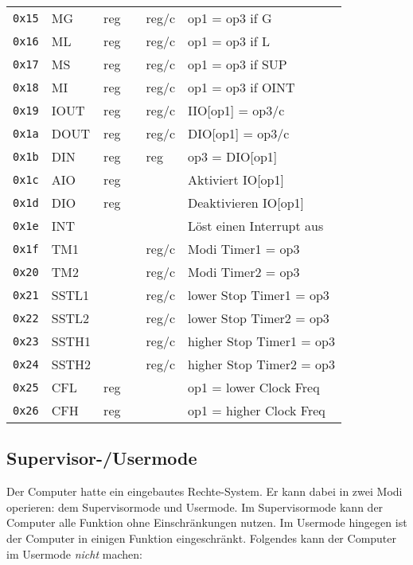 \documentclass{scrartcl}
\begin{document}
\begin{center}
\begin{table*}
\begin{tabular}{l | l l l l | l}
			\texttt{0x15} & MG   & reg &  & reg/c & op1 = op3 if G \\
			\texttt{0x16} & ML   & reg &  & reg/c & op1 = op3 if L \\
			\texttt{0x17} & MS & reg &  & reg/c & op1 = op3 if SUP \\
			\texttt{0x18} & MI & reg &  & reg/c & op1 = op3 if OINT \\
			\hline
			\texttt{0x19} & IOUT & reg &  & reg/c & IIO[op1] = op3/c \\
			\texttt{0x1a} & DOUT & reg &  & reg/c & DIO[op1] = op3/c \\
			\texttt{0x1b} & DIN  & reg &  & reg & op3 = DIO[op1] \\
			\texttt{0x1c} & AIO  & reg &  &  & Aktiviert IO[op1] \\
			\texttt{0x1d} & DIO  & reg &  &  & Deaktivieren IO[op1] \\
			\hline
			\texttt{0x1e} & INT  & & & & Löst einen Interrupt aus \\
			\texttt{0x1f} & TM1  & & & reg/c & Modi Timer1 = op3 \\
			\texttt{0x20} & TM2  & & & reg/c & Modi Timer2 = op3 \\
			\texttt{0x21} & SSTL1 & & & reg/c & lower Stop Timer1 = op3 \\
			\texttt{0x22} & SSTL2 & & & reg/c & lower Stop Timer2 = op3 \\
			\texttt{0x23} & SSTH1 & & & reg/c & higher Stop Timer1 = op3 \\			
			\texttt{0x24} & SSTH2 & & & reg/c & higher Stop Timer2 = op3 \\
			\texttt{0x25} & CFL  & reg & & & op1 = lower Clock Freq \\
			\texttt{0x26} & CFH  & reg & & & op1 = higher Clock Freq \\
			
			\hline
		\end{tabular}
	\end{table*}
\end{center}


\subsection{\label{section:supervisor}Supervisor-/Usermode}

Der Computer hatte ein eingebautes Rechte-System. Er kann dabei in zwei Modi operieren: dem Supervisormode und Usermode. Im Supervisormode kann der Computer alle Funktion ohne Einschränkungen nutzen. Im Usermode hingegen ist der Computer in einigen Funktion eingeschränkt. Folgendes kann der Computer im Usermode \emph{nicht} machen:
\end{document}
